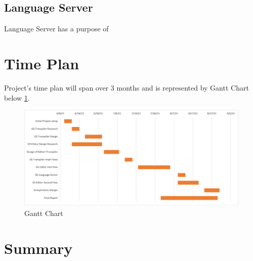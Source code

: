 \documentclass{article}
\begin{document}
\subsection*{Language Server}
Language Server has a purpose of 

\section{Time Plan}
Project's time plan will span over 3 months and is represented by Gantt Chart below \ref{fig:gantt}.

\begin{figure}[H]
\centering
\includegraphics[width=1\textwidth]{Gantt.png}
\caption{Gantt Chart}
\label{fig:gantt}
\end{figure}

\section{Summary}




\end{document}
